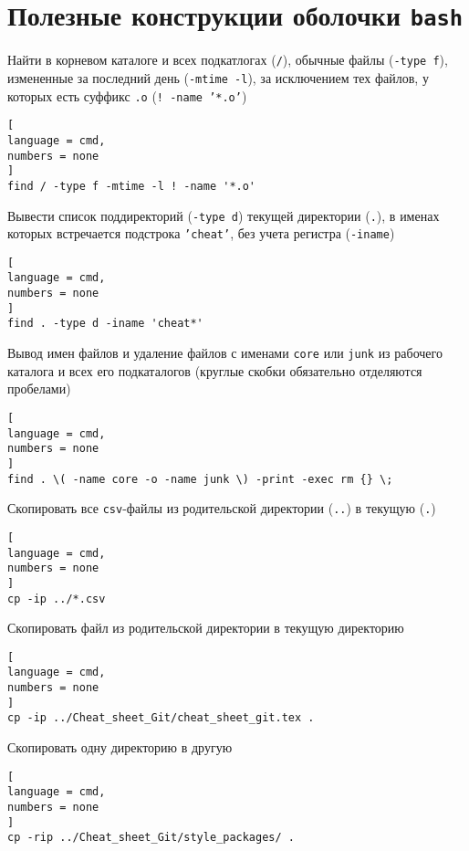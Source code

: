 \documentclass[%
	11pt,
	a4paper,
	utf8,
		]{article}
\begin{document}
\section{Полезные конструкции оболочки \texttt{bash}}

Найти в корневом каталоге и всех подкатлогах (\texttt{/}), обычные файлы (\texttt{-type f}), измененные за последний день (\texttt{-mtime -l}), за исключением тех файлов, у которых есть суффикс \texttt{.o} (\texttt{! -name '*.o'})

\begin{lstlisting}[
language = cmd,
numbers = none
]
find / -type f -mtime -l ! -name '*.o'
\end{lstlisting}

Вывести список поддиректорий (\texttt{-type d}) текущей директории (\texttt{.}), в именах которых встречается подстрока \texttt{'cheat'}, без учета регистра (\texttt{-iname})

\begin{lstlisting}[
language = cmd,
numbers = none
]
find . -type d -iname 'cheat*'
\end{lstlisting}

Вывод имен файлов и удаление файлов с именами \texttt{core} или \texttt{junk} из рабочего каталога и всех его подкаталогов (круглые скобки обязательно отделяются пробелами)

\begin{lstlisting}[
language = cmd,
numbers = none
]
find . \( -name core -o -name junk \) -print -exec rm {} \;
\end{lstlisting}

Скопировать все \texttt{csv}-файлы из родительской директории (\texttt{..}) в текущую (\texttt{.})

\begin{lstlisting}[
language = cmd,
numbers = none
]
cp -ip ../*.csv
\end{lstlisting}

Скопировать файл из родительской директории в текущую директорию

\begin{lstlisting}[
language = cmd,
numbers = none
]
cp -ip ../Cheat_sheet_Git/cheat_sheet_git.tex .
\end{lstlisting}

Скопировать одну директорию в другую

\begin{lstlisting}[
language = cmd,
numbers = none
]
cp -rip ../Cheat_sheet_Git/style_packages/ .
\end{lstlisting}
\end{document}
